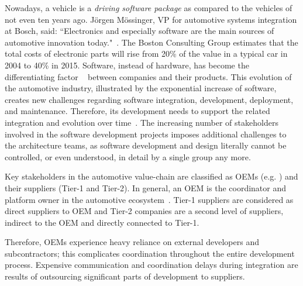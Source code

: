 Nowadays, a vehicle is a {\em driving software package} as compared to the vehicles of not even ten years ago. J\"orgen M\"ossinger, VP for automotive systems integration at Bosch, said: ``Electronics and especially software are the main sources of automotive innovation today."~\cite{Mossinger2010SoftwareAutomotive}. The Boston Consulting Group estimates that the total costs of electronic parts will rise from 20\% of the value in a typical car in 2004 to 40\% in 2015. Software, instead of hardware, has become the differentiating factor%
~\cite{ConnectedVehicle2012,hbr2015hardwaresoftware,Mossinger2010SoftwareAutomotive,Broy:2006:CAS:1134285.1134292} %
between companies and their products. This evolution of the automotive industry, illustrated by the exponential increase of software, creates new challenges regarding software integration, development, deployment, and maintenance. Therefore, its development needs to support the related integration and evolution over time~\cite{Broy:2006:CAS:1134285.1134292,qualman2009socialnomics,JansenTale2009}. The increasing number of stakeholders involved in the software development projects imposes additional challenges to the architecture teams, as software development and design literally cannot be controlled, or even understood, in detail by a single group any more. 

Key stakeholders in the automotive value-chain are classified as OEMs (e.g. \company{}) and their suppliers (Tier-1 and Tier-2). 
In general, an OEM is the coordinator and platform owner in the automotive ecosystem~\cite{KS15}. 
Tier-1 suppliers are considered as direct suppliers to OEM and Tier-2 companies are a second level of suppliers, indirect to the OEM and directly connected to Tier-1. 


Therefore, OEMs experience heavy reliance on external developers and subcontractors; this complicates coordination throughout the entire development process. Expensive communication and coordination delays during integration are results of outsourcing significant parts of development to suppliers. %


